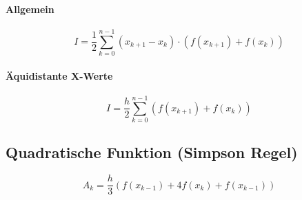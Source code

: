\paragraph{Allgemein}

\begin{displaymath}
	I = \frac{1}{2} \sum_{k=0}^{n-1} (x_{k+1} - x_k) \cdot (f(x_{k+1}) + f(x_k))
\end{displaymath}

\paragraph{Äquidistante X-Werte}

\begin{displaymath}
	I = \frac{h}{2} \sum_{k=0}^{n-1} (f(x_{k+1}) + f(x_k))
\end{displaymath}

\subsection{Quadratische Funktion (Simpson Regel)}

\begin{displaymath}
	A_k = \frac{h}{3} (f(x_{k-1}) + 4f(x_k) + f(x_{k-1}))
\end{displaymath}